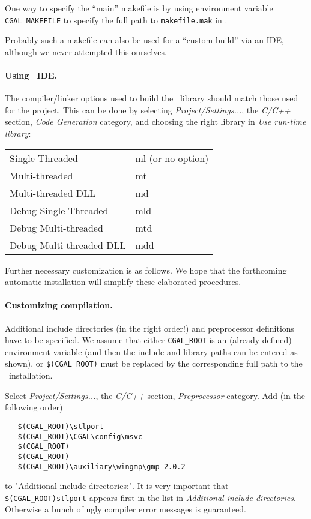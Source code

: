 One way to specify the ``main'' makefile is by using environment
variable \texttt{CGAL\_MAKEFILE} to specify the full path to 
\texttt{makefile.mak} in
\CGALR .

Probably such a makefile can also be used for a ``custom build'' via an
IDE, although we never attempted this ourselves.


\paragraph{Using \msvc\ IDE.}

The compiler/linker options used to build the \cgal\ library should
match those used for the project. This can be done by
selecting {\em Project/Settings...}, the {\em C/C++} section,
{\em Code Generation} category, and choosing the right
library in {\em Use run-time library}:

\begin{tabular}{|l|l|} \hline
Single-Threaded&                 ml (or no option)\\
Multi-threaded &                 mt\\
Multi-threaded DLL&              md\\
Debug Single-Threaded &          mld\\
Debug Multi-threaded   &         mtd\\
Debug Multi-threaded DLL&        mdd\\\hline
\end{tabular}

Further necessary customization is as follows.
We hope that the forthcoming automatic installation will simplify
these elaborated procedures.


\paragraph{Customizing compilation.}
Additional include directories (in the right order!) and preprocessor
definitions have to be specified.  We assume that either 
\texttt{CGAL\_ROOT} is
an (already defined) environment variable (and then the include and
library paths can be entered as shown), or 
\texttt{\$(CGAL\_ROOT)} must be
replaced by the corresponding full path to the \cgal\ installation.

Select {\em Project/Settings...}, the {\em C/C++}
section, {\em Preprocessor} category. Add (in the following order)
\begin{verbatim}
   $(CGAL_ROOT)\stlport
   $(CGAL_ROOT)\CGAL\config\msvc
   $(CGAL_ROOT)
   $(CGAL_ROOT)
   $(CGAL_ROOT)\auxiliary\wingmp\gmp-2.0.2
\end{verbatim}
to "Additional include directories:".
 It is very important that 
\texttt{\$(CGAL\_ROOT)\bslsh stlport} 
appears first in the list in {\em Additional include directories}. 
Otherwise a bunch
of ugly compiler error messages is guaranteed.

